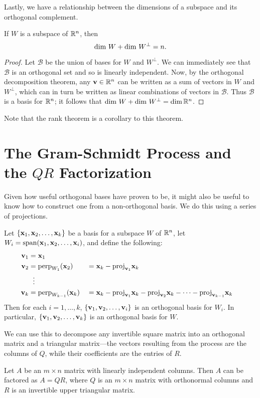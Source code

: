 \documentclass[../m073main.tex]{subfiles}
\begin{document}
Lastly, we have a relationship between the dimensions of a subspace and its orthogonal complement.

\begin{theorem}
	If $W$ is a subspace of $\mathbb{R}^n$, then
	\[ \textrm{dim } W + \textrm{dim } W^\perp = n. \]
\end{theorem}

\begin{proof}
	Let $\mathcal B$ be the union of bases for $W$ and $W^\perp$.
	We can immediately see that $\mathcal B$ is an orthogonal set and so is linearly independent.
	Now, by the orthogonal decomposition theorem, any $\mathbf{v} \in \mathbb{R}^n$ can be written as a sum of vectors in $W$ and $W^\perp$, which can in turn be written as linear combinations of vectors in $\mathcal B$.
	Thus $\mathcal B$ is a basis for $\mathbb{R}^n$; it follows that $\textrm{dim } W + \textrm{dim } W^\perp = \dim \mathbb{R}^n$.
\end{proof}

Note that the rank theorem is a corollary to this theorem.

\section{The Gram-Schmidt Process and the $QR$ Factorization}
Given how useful orthogonal bases have proven to be, it might also be useful to know how to construct one from a non-orthogonal basis.
We do this using a series of projections.

\begin{theorem}
	Let $\{\mathbf{x}_1, \mathbf{x}_2, \ldots, \mathbf{x}_k\}$ be a basis for a subspace $W$ of $\mathbb{R}^n$, let $W_i = \textrm{span}(\mathbf{x}_1, \mathbf{x}_2, \ldots, \mathbf{x}_i)$, and define the following:
	\begin{alignat*}{2}
		\mathbf{v}_1 &= \mathbf{x}_1 \\
		\mathbf{v}_2 &= \textrm{perp}_{W_1}(\mathbf{x}_2) &&= \mathbf{x}_k - \textrm{proj}_{\mathbf{v}_1}\mathbf{x}_k \\
		&\phantom{~!}\vdots \\
		\mathbf{v}_k &= \textrm{perp}_{W_{k-1}}(\mathbf{x}_k) &&= \mathbf{x}_k - \textrm{proj}_{\mathbf{v}_1}\mathbf{x}_k - \textrm{proj}_{\mathbf{v}_2}\mathbf{x}_k - \cdots - \textrm{proj}_{\mathbf{v}_{k-1}}\mathbf{x}_k
	\end{alignat*}
	Then for each $i = 1, \ldots, k$, $\{\mathbf{v}_1, \mathbf{v}_2, \ldots, \mathbf{v}_i\}$ is an orthogonal basis for $W_i$.
	In particular, $\{\mathbf{v}_1, \mathbf{v}_2, \ldots, \mathbf{v}_k\}$ is an orthogonal basis for $W$.
\end{theorem}

We can use this to decompose any invertible square matrix into an orthogonal matrix and a triangular matrix---the vectors resulting from the process are the columns of $Q$, while their coefficients are the entries of $R$.

\begin{theorem}[$QR$ factorization]
	Let $A$ be an $m \times n$ matrix with linearly independent columns.
	Then $A$ can be factored as $A = QR$, where $Q$ is an $m \times n$ matrix with orthonormal columns and $R$ is an invertible upper triangular matrix.
\end{theorem}
\end{document}
